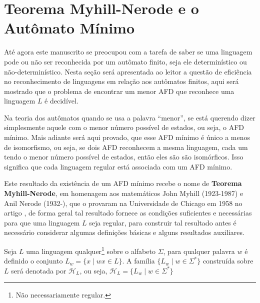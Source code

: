 \section{Teorema Myhill-Nerode e o Autômato Mínimo}\label{sec:Teorema-MyHill-Nerode}

Até agora este manuscrito se preocupou com a tarefa de saber se uma linguagem pode ou não ser reconhecida por um autômato finito,  seja ele determinístico ou não-determinístico. Nesta seção será apresentada ao leitor a questão de eficiência no reconhecimento de linguagens em relação aos autômatos finitos, aqui será mostrado que o problema de encontrar um menor AFD que reconhece uma linguagem $L$ é decidível. 

Na teoria dos autômatos quando se usa a palavra ``menor'', se está querendo dizer simplesmente aquele com o menor número possível de estados, ou seja, o AFD mínimo.  Mais adiante será aqui provado, que esse AFD mínimo é único a menos de isomorfismo, ou seja, se dois AFD reconhecem a mesma linguagem, cada um tendo o menor número possível de estados, então eles são são isomórficos. Isso significa que cada linguagem regular está associada com um AFD mínimo. 

Este resultado da existência de um AFD mínimo recebe o nome de \textbf{Teorema Myhill-Nerode}, em homenagem aos matemáticos John Myhill (1923-1987) e Anil Nerode (1932-), que o provaram na Universidade de Chicago em 1958 no artigo \cite{nerode1958}, de forma geral tal resultado fornece as condições suficientes e necessárias para que uma linguagem $L$ seja regular, para construir tal resultado antes é necessário considerar algumas definições básicas e alguns resultados auxiliares.


\begin{definicao}\label{def:FamiliaH-L}
	Seja $L$ uma linguagem qualquer\footnote{Não necessariamente regular.} sobre o alfabeto $\Sigma$, para qualquer palavra $w$ é definido o conjunto $L_w = \{x \mid wx \in L\}$. A família $\{L_w \mid w \in \Sigma^*\}$ construída sobre $L$ será denotada por $\mathcal{H}_L$, ou seja, $\mathcal{H}_L = \{L_w \mid w \in \Sigma^*\}$
\end{definicao}

